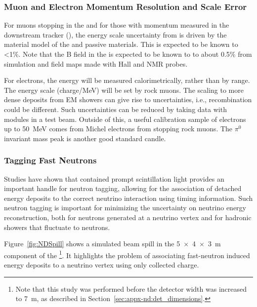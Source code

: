 \subsubsection{Muon and Electron Momentum Resolution and Scale Error}


For muons stopping in the  and for those with momentum measured in the downstream tracker (), the energy scale uncertainty from  is driven by the material model of the  and passive materials.  This is expected to be known to \textless 1\%.  Note that the B field in the  is expected to be known to to about 0.5\% from simulation and field maps made with Hall and NMR probes.

For electrons, the energy will be measured calorimetrically, rather than by range.  The  energy scale (charge/MeV) will be set by rock muons.  The scaling to more dense deposits from EM showers can give rise to uncertainties, i.e., recombination could be different.  Such uncertainties can be reduced by taking data with  modules in a test beam.  Outside of this, a useful calibration sample
of electrons up to \SI{50}{MeV} comes from Michel electrons from stopping rock muons. The $\pi^0$ invariant mass peak is another good standard candle.



\subsubsection{Tagging Fast Neutrons}

Studies have shown that contained prompt scintillation light provides an important handle for neutron tagging, allowing for the association of detached energy deposits to the correct neutrino interaction using timing information. Such neutron tagging is important for minimizing the uncertainty on neutrino energy reconstruction, both for neutrons generated at a neutrino vertex and for hadronic showers that fluctuate to neutrons. 

Figure~\ref{fig:NDSpill} shows a simulated beam spill in the \SI[product-units=repeat]{5x4x3}{\metre}  component of the   \footnote{Note that this study was performed before the detector width was increased to \SI{7}{m}, as described in Section~\ref{sec:appx-nd:det_dimensions}.}. 
It highlights the problem of associating fast-neutron induced energy deposits to a neutrino vertex using only collected charge.  

